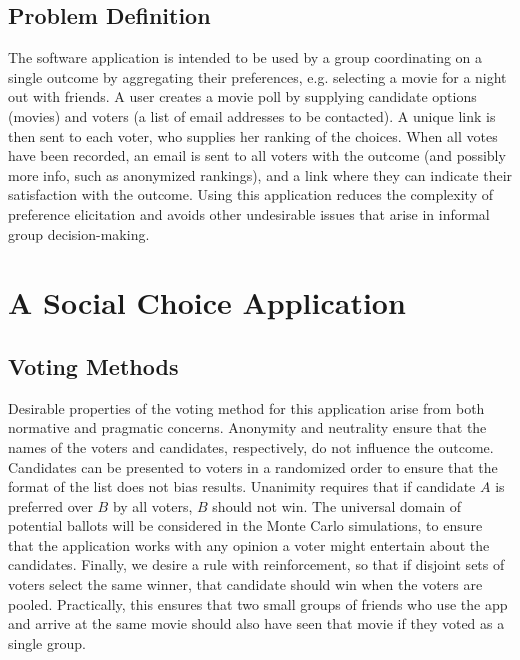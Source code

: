 \documentclass[12pt,letterpaper]{article} %
\begin{document}
\subsection{Problem Definition} 


The software application is intended to be used by a group coordinating on a single outcome by aggregating their preferences, e.g. selecting a movie for a night out with friends. A user creates a movie poll by supplying candidate options (movies) and voters (a list of email addresses to be contacted). A unique link is then sent to each voter, who supplies her ranking of the choices. When all votes have been recorded, an email is sent to all voters with the outcome (and possibly more info, such as anonymized rankings), and a link where they can indicate their satisfaction with the outcome. Using this application reduces the complexity of preference elicitation and avoids other undesirable issues that arise in informal group decision-making.


\section{A Social Choice Application}

\subsection{Voting Methods}

Desirable properties of the voting method for this application arise from both normative and pragmatic concerns. Anonymity and neutrality ensure that the names of the voters and candidates, respectively, do not influence the outcome. Candidates can be presented to voters in a randomized order to ensure that the format of the list does not bias results. Unanimity requires that if candidate $A$ is preferred over $B$ by all voters, $B$ should not win. The universal domain of potential ballots will be considered in the Monte Carlo simulations, to ensure that the application works with any opinion a voter might entertain about the candidates. Finally, we desire a rule with reinforcement, so that if disjoint sets of voters select the same winner, that candidate should win when the voters are pooled. Practically, this ensures that two small groups of friends who use the app and arrive at the same movie should also have seen that movie if they voted as a single group.
\end{document}
